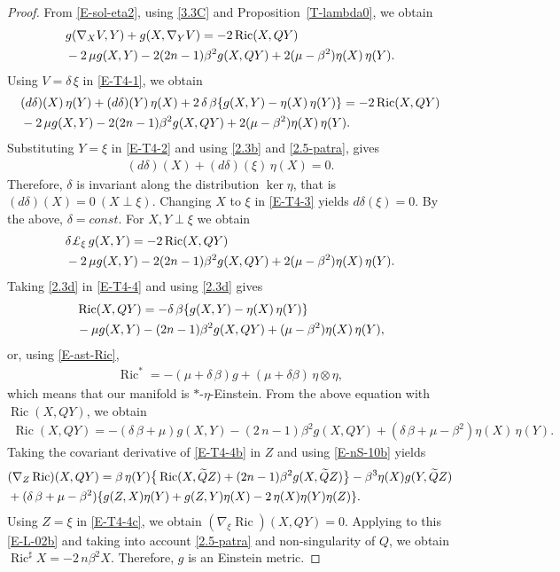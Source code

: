 \documentclass[10pt,a4paper]{amsart}
\def\Ric{\operatorname{Ric}}
\begin{document}
\begin{proof}
From \eqref{E-sol-eta2}, using \eqref{3.3C} and Proposition~\ref{T-lambda0}, we obtain
\begin{align}\label{E-T4-1}
\notag
 & g(\nabla_X V, Y) + g(X, \nabla_Y V) = - 2\Ric(X,QY) \\
 & - 2\,\mu g(X,Y) - 2(2n-1)\beta^2 g(X,QY) + 2(\mu-\beta^2)\eta(X)\,\eta(Y) .
\end{align}
Using $V=\delta\,\xi$ in \eqref{E-T4-1}, we obtain
\begin{align}\label{E-T4-2}
\notag
 & (d\delta)(X)\,\eta(Y) + (d\delta)(Y)\,\eta(X)
 + 2\,\delta\,\beta\{g(X,Y) - \eta(X)\,\eta(Y)\}
 = - 2\Ric(X,QY) \\
 & - 2\,\mu g(X,Y) - 2(2n-1)\beta^2 g(X,QY) + 2(\mu-\beta^2)\eta(X)\,\eta(Y) .
\end{align}
Substituting $Y=\xi$ in \eqref{E-T4-2} and using \eqref{2.3b} and \eqref{2.5-patra}, gives
\begin{align}\label{E-T4-3}
 (d\delta)(X) + (d\delta)(\xi)\,\eta(X) = 0 .
\end{align}
Therefore, $\delta$ is invariant along the distribution
$\ker\eta$, that is $(d\delta)(X)=0\ (X\perp\xi)$.
Changing $X$ to $\xi$ in \eqref{E-T4-3} yields $d\delta(\xi)=0$.
By the above, $\delta=const$. For $X,Y\perp\xi$ we obtain
\begin{align}\label{E-T4-4}
\notag
 & \delta \pounds_\xi\,g(X,Y) = - 2\Ric(X,QY) \\
 & - 2\,\mu g(X,Y) - 2(2n-1)\beta^2 g(X,QY) + 2(\mu-\beta^2)\eta(X)\,\eta(Y) .
\end{align}
Taking \eqref{2.3d} in \eqref{E-T4-4} and using \eqref{2.3d} gives
\begin{align*}
\notag
 & \Ric(X,QY) = -\delta\,\beta\{g(X,Y)-\eta(X)\,\eta(Y)\} \\
 & - \mu g(X,Y) - (2n-1)\beta^2 g(X,QY) + (\mu-\beta^2)\eta(X)\,\eta(Y) ,
\end{align*}
or, using \eqref{E-ast-Ric},
\begin{align*}%
 \Ric^\ast = -(\mu+\delta\,\beta) g + (\mu + \delta\beta)\,\eta\otimes\eta,
\end{align*}
which means that our manifold is $\ast$-$\eta$-Einstein.
From the above equation with $\Ric(X,QY)$, we obtain
\begin{align}\label{E-T4-4b}
 \Ric(X,QY) = -(\delta\,\beta+\mu) g(X,Y) -(2\,n-1)\beta^2 g(X,QY) +(\delta\,\beta+\mu-\beta^2)\eta(X)\,\eta(Y) .
\end{align}
Taking the covariant derivative of \eqref{E-T4-4b} in $Z$ and using \eqref{E-nS-10b} yields
\begin{align}\label{E-T4-4c}
\notag
 & (\nabla_Z\Ric)(X,QY) = \beta\,\eta(Y)\big\{\Ric(X,\widetilde Q Z) + (2n-1)\beta^2 g(X,\widetilde Q Z)\big\}
 - \beta^3\eta(X) g(Y,\widetilde Q Z)\\
 & + (\delta\,\beta+\mu-\beta^2)\{ g(Z,X)\eta(Y) + g(Z,Y)\eta(X) - 2\,\eta(X)\eta(Y)\eta(Z)\} .
\end{align}
Using $Z=\xi$ in \eqref{E-T4-4c}, we obtain $(\nabla_\xi\Ric)(X,QY)=0$.
Applying to this \eqref{E-L-02b} and taking into account \eqref{2.5-patra} and non-singularity of $Q$, we obtain $\Ric^\sharp X=-2\,n\beta^2 X$.
Therefore, $g$ is an Einstein metric.
\end{proof}
\end{document}
